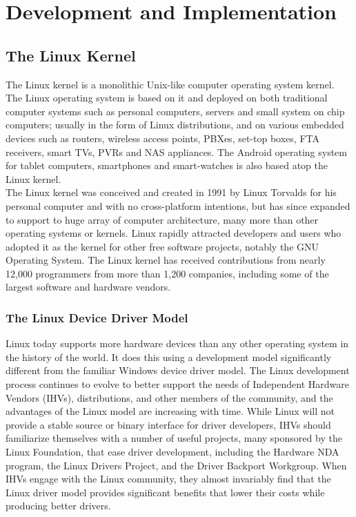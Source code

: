 \chapter{Development and Implementation}
\section{The Linux Kernel}
The Linux kernel is a monolithic Unix-like computer operating system kernel. The Linux operating system is based on it and deployed on both traditional computer systems such as personal computers, servers and small system on chip computers; usually in the form of Linux distributions, and on various embedded devices such as routers, wireless access points, PBXes, set-top boxes, FTA receivers, smart TVs, PVRs and NAS appliances. The Android operating system for tablet computers, smartphones and smart-watches is also based atop the Linux kernel.\\
The Linux kernel was conceived and created in 1991 by Linux Torvalds for his personal computer and with no cross-platform intentions, but has since expanded to support to huge array of computer architecture, many more than other operating systems or kernels. Linux rapidly attracted developers and users who adopted it as the kernel for other free software projects, notably the GNU Operating System. The Linux kernel has received contributions from nearly 12,000 programmers from more than 1,200 companies, including some of the largest software and hardware vendors.
\subsection{The Linux Device Driver Model}
Linux today supports more hardware devices than any other operating system in the history of the world. It does this using a development model significantly different from the familiar Windows device driver model. The Linux development process continues to evolve to better support the needs of Independent Hardware Vendors (IHVs), distributions, and other members of the community, and the advantages of the Linux model are increasing with time. While Linux will not provide a stable source or binary interface for driver developers, IHVs should familiarize themselves with a number of useful projects, many sponsored by the Linux Foundation, that ease driver development, including the Hardware NDA program, the Linux Drivers Project, and the Driver Backport Workgroup. When IHVs engage with the Linux community, they almost invariably find that the Linux driver model provides significant benefits that lower their costs while producing better drivers.
